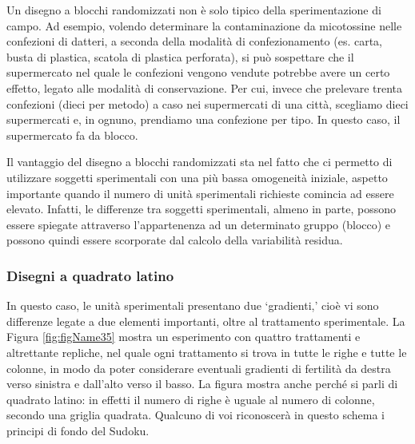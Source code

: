 \documentclass[a4paper,12pt,oneside]{book}
\begin{document}
Un disegno a blocchi randomizzati non è solo tipico della sperimentazione di campo. Ad esempio, volendo determinare la contaminazione da micotossine nelle confezioni di datteri, a seconda della modalità di confezionamento (es. carta, busta di plastica, scatola di plastica perforata), si può sospettare che il supermercato nel quale le confezioni vengono vendute potrebbe avere un certo effetto, legato alle modalità di conservazione. Per cui, invece che prelevare trenta confezioni (dieci per metodo) a caso nei supermercati di una città, scegliamo dieci supermercati e, in ognuno, prendiamo una confezione per tipo. In questo caso, il supermercato fa da blocco.

Il vantaggio del disegno a blocchi randomizzati sta nel fatto che ci permetto di utilizzare soggetti sperimentali con una più bassa omogeneità iniziale, aspetto importante quando il numero di unità sperimentali richieste comincia ad essere elevato. Infatti, le differenze tra soggetti sperimentali, almeno in parte, possono essere spiegate attraverso l'appartenenza ad un determinato gruppo (blocco) e possono quindi essere scorporate dal calcolo della variabilità residua.

\hypertarget{disegni-a-quadrato-latino}{%
\subsubsection{Disegni a quadrato latino}\label{disegni-a-quadrato-latino}}

In questo caso, le unità sperimentali presentano due `gradienti,' cioè vi sono differenze legate a due elementi importanti, oltre al trattamento sperimentale. La Figura \ref{fig:figName35} mostra un esperimento con quattro trattamenti e altrettante repliche, nel quale ogni trattamento si trova in tutte le righe e tutte le colonne, in modo da poter considerare eventuali gradienti di fertilità da destra verso sinistra e dall'alto verso il basso. La figura mostra anche perché si parli di quadrato latino: in effetti il numero di righe è uguale al numero di colonne, secondo una griglia quadrata. Qualcuno di voi riconoscerà in questo schema i principi di fondo del Sudoku.
\end{document}
